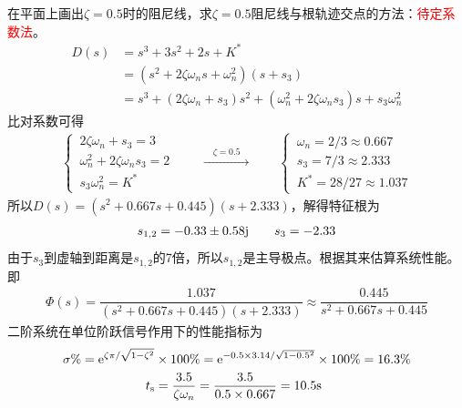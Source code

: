 在平面上画出$\zeta =0.5$时的阻尼线，求$\zeta = 0.5$阻尼线与根轨迹交点的方法：\textcolor{red}{待定系数法}。
\begin{align*}
	D(s) &= s^3 + 3 s^2 + 2s + K^*\\
	& = \left(s^2 + 2 \zeta \omega_ns + \omega_n^2 \right)(s + s_3)\\
	& = s^3 + (2 \zeta \omega_n + s_3)s^2 +(\omega_n^2 + 2\zeta \omega_ns_3)s + s_3\omega_n^2
\end{align*}
比对系数可得
\begin{align*}
	\begin{cases}
		\, 2 \zeta \omega_n + s_3 = 3\\
		\, \omega_n^2 + 2\zeta \omega_ns_3 = 2 \\
		\, s_3\omega_n^2 = K^*
	\end{cases}
\quad \quad 
\xrightarrow{\quad \textstyle \zeta = 0.5 \quad }
\quad \quad 
	\begin{cases}
		\, \omega_n = 2/3 \approx 0.667\\
		\, s_3 = 7/3 \approx 2.333\\
		\, K^* = 28/27 \approx 1.037
	\end{cases}
\end{align*}
所以$D(s) = (s^2 + 0.667s + 0.445)(s + 2.333)$，解得特征根为
\begin{align*}
	s_{1,2} = -0.33 \pm 0.58 \text{j} \quad \quad s_3 = -2.33
\end{align*}
由于$s_3$到虚轴到距离是$s_{1,2}$的7倍，所以$s_{1,2}$是主导极点。根据其来估算系统性能。即
\begin{align*}
	\varPhi(s) = \dfrac{1.037}{(s^2 + 0.667s + 0.445)(s + 2.333)} \approx  \dfrac{0.445}{s^2 + 0.667s + 0.445}
\end{align*}
二阶系统在单位阶跃信号作用下的性能指标为
\begin{align*}
	\sigma \% = {\rm{e}} ^{\zeta \pi / \sqrt{1 - \zeta^2}} &\times 100 \% = {\rm{e}}^{-0.5\times 3.14/\sqrt{1 - 0.5^2}} \times 100 \% = 16.3 \% \\
	t_{\text{s}} &= \dfrac{3.5}{\zeta \omega_n} = \dfrac{3.5}{0.5 \times 0.667} = 10.5 \text{s}
\end{align*}
\vspace*{1em}

